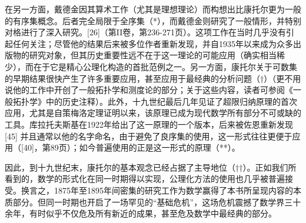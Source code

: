 在另一方面，戴德金因其算术工作（尤其是理想理论）而构想出比康托尔更为一般的有序集概念。后者完全局限于全序集（*），而戴德金则研究了一般情形，并特别对格进行了深入研究。{[}26{]}（第II卷，第236-271页）。这项工作在当时几乎没有引起任何关注；尽管他的结果后来被多位作者重新发现，并自1935年以来成为众多出版物的研究对象，但其历史重要性远不在于这一理论的可能应用（确实相当稀少），而在于它是精心公理化构造的首批范例之一。另一方面，康托尔关于可数集的早期结果很快产生了许多重要应用，甚至应用于最经典的分析问题（†）（更不用说他的工作中开创了一般拓扑学和测度论的部分；关于这些内容，读者可参阅《一般拓扑学》中的历史注释）。此外，十九世纪最后几年见证了超限归纳原理的首次应用，尤其是自策梅洛定理证明以来，该原理已成为现代数学所有部分不可或缺的工具。库拉托夫斯基在1922年给出了这一原理的一个版本，后来被佐恩重新发现 {[}45{]} 并且通常以他的名字命名，由于避免了良序集的使用，这一形式往往更便于应用（{[}40{]}，第89页）；如今普遍使用的正是这一形式的原理（**）。

因此，到十九世纪末，康托尔的基本观念已经占据了主导地位（††）。正如我们所看到的，数学的形式化在同一时期得以实现，公理化方法的使用也几乎被普遍接受。换言之，1875年至1895年间密集的研究工作为数学赢得了本书所呈现内容的本质部分。但同一时期也开启了一场罕见的“基础危机”，这场危机震撼了数学界三十余年，有时似乎不仅危及所有新近的成果，甚至危及数学中最经典的部分。


